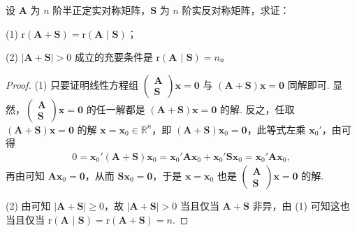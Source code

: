 \documentclass[../../main.tex]{subfiles}
\begin{document}
\begin{proposition}\label{proposition:半正定与实反称阵关于秩的性质}
设 $\boldsymbol{A}$ 为 $n$ 阶半正定实对称矩阵，$\boldsymbol{S}$ 为 $n$ 阶实反对称矩阵，求证：

(1) $\mathrm{r}\left( \boldsymbol{A}+\boldsymbol{S} \right) =\mathrm{r}\left( \boldsymbol{A}\,\,|\,\,\boldsymbol{S} \right) $；

(2) $|\boldsymbol{A}+\boldsymbol{S}|>0$ 成立的充要条件是 $\mathrm{r}\left( \boldsymbol{A}\,\,|\,\,\boldsymbol{S} \right)=n$。
\end{proposition}
\begin{proof}
(1) 只要证明线性方程组 $\begin{pmatrix}
\boldsymbol{A} \\
\boldsymbol{S}
\end{pmatrix}\boldsymbol{x}=\boldsymbol{0}$ 与 $(\boldsymbol{A}+\boldsymbol{S})\boldsymbol{x}=\boldsymbol{0}$ 同解即可. 显然，$\begin{pmatrix}
\boldsymbol{A} \\
\boldsymbol{S}
\end{pmatrix}\boldsymbol{x}=\boldsymbol{0}$ 的任一解都是 $(\boldsymbol{A}+\boldsymbol{S})\boldsymbol{x}=\boldsymbol{0}$ 的解. 反之，任取 $(\boldsymbol{A}+\boldsymbol{S})\boldsymbol{x}=\boldsymbol{0}$ 的解 $\boldsymbol{x}=\boldsymbol{x}_0\in\mathbb{R}^n$，即 $(\boldsymbol{A}+\boldsymbol{S})\boldsymbol{x}_0=\boldsymbol{0}$，此等式左乘 $\boldsymbol{x}_0'$，由可得
\begin{align*}
0=\boldsymbol{x}_0'(\boldsymbol{A}+\boldsymbol{S})\boldsymbol{x}_0=\boldsymbol{x}_0'\boldsymbol{A}\boldsymbol{x}_0+\boldsymbol{x}_0'\boldsymbol{S}\boldsymbol{x}_0=\boldsymbol{x}_0'\boldsymbol{A}\boldsymbol{x}_0,
\end{align*}
再由可知 $\boldsymbol{A}\boldsymbol{x}_0=\boldsymbol{0}$，从而 $\boldsymbol{S}\boldsymbol{x}_0=\boldsymbol{0}$，于是 $\boldsymbol{x}=\boldsymbol{x}_0$ 也是 $\begin{pmatrix}
\boldsymbol{A} \\
\boldsymbol{S}
\end{pmatrix}\boldsymbol{x}=\boldsymbol{0}$ 的解.

(2) 由可知 $|\boldsymbol{A}+\boldsymbol{S}|\geqslant 0$，故 $|\boldsymbol{A}+\boldsymbol{S}|>0$ 当且仅当 $\boldsymbol{A}+\boldsymbol{S}$ 非异，由 (1) 可知这也当且仅当 $\mathrm{r}\left( \boldsymbol{A}\,\,|\,\,\boldsymbol{S} \right) =\mathrm{r}(\boldsymbol{A}+\boldsymbol{S})=n$.
\end{proof}
\end{document}
